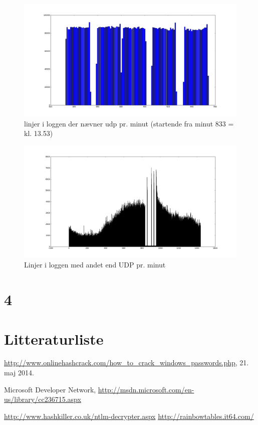 \documentclass[10pt,a4paper,danish]{article}
\begin{document}
\begin{figure}[h!]
  \centering
  \includegraphics[width=\textwidth]{udp-activity.png}
  \caption{linjer i loggen der nævner udp pr. minut (startende fra minut 833 = kl. 13.53)}
  \label{fig:ddos-udp-activity}
\end{figure}

\begin{figure}[h!]
  \centering
  \includegraphics[width=\textwidth]{non-udp-activity.png}
  \caption{Linjer i loggen med andet end UDP pr. minut}
  \label{fig:ddos-non-udp-activity}
\end{figure}


\section{4}

\section{Litteraturliste}

\begin{thebibliography}{9}

  \url{http://www.onlinehashcrack.com/how_to_crack_windows_passwords.php}, 21.
  maj 2014.

 Microsoft Developer Network,
  \url{http://msdn.microsoft.com/en-us/library/cc236715.aspx}

 \url{http://www.hashkiller.co.uk/ntlm-decrypter.aspx}
 \url{http://rainbowtables.it64.com/}

\end{thebibliography}
\end{document}
